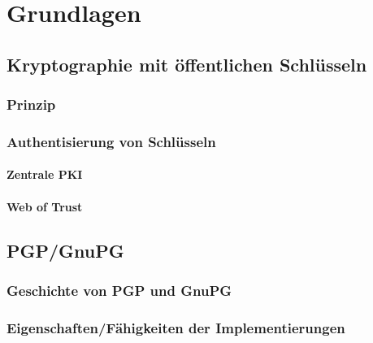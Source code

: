 
\chapter{Grundlagen}
\label{ch:Grundlagen}

\section{Kryptographie mit öffentlichen Schlüsseln}
\label{ch:Grundlagen:sec:PublicKeyCrypto}

\subsection{Prinzip}
\label{ch:Grundlagen:sec:PublicKeyCrypto:subsec:Prinzip}

\subsection{Authentisierung von Schlüsseln}
\label{ch:Grundlagen:sec:PublicKeyCrypto:subsec:KeyAuth}

\subsubsection{Zentrale PKI}
\label{ch:Grundlagen:sec:PublicKeyCrypto:subsec:KeyAuth:subsubsec:PKI}

\subsubsection{Web of Trust}
\label{ch:Grundlagen:sec:PublicKeyCrypto:subsec:KeyAuth:subsubsec:WOT}

\section{PGP/GnuPG}
\label{ch:Grundlagen:sec:PGP}

\subsection{Geschichte von PGP und GnuPG}
\label{ch:Grundlagen:sec:PGP:subsec:Geschichte}

\subsection{Eigenschaften/Fähigkeiten der Implementierungen}
\label{ch:Grundlagen:sec:PGP:subsec:Eigenschaften}


